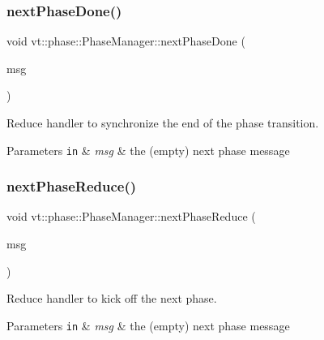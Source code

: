 \subsubsection{\texorpdfstring{next\+Phase\+Done()}{nextPhaseDone()}}
{\footnotesize\ttfamily void vt\+::phase\+::\+Phase\+Manager\+::next\+Phase\+Done (\begin{DoxyParamCaption}\item[{\hyperlink{structvt_1_1phase_1_1_next_msg}{Next\+Msg} $\ast$}]{msg }\end{DoxyParamCaption})\hspace{0.3cm}{\ttfamily [private]}}



Reduce handler to synchronize the end of the phase transition. 


\begin{DoxyParams}[1]{Parameters}
\mbox{\tt in}  & {\em msg} & the (empty) next phase message \\
\hline
\end{DoxyParams}
\mbox{\label{structvt_1_1phase_1_1_phase_manager_a59345a6496fb1413de1a1899fe4532cf}} 
\subsubsection{\texorpdfstring{next\+Phase\+Reduce()}{nextPhaseReduce()}}
{\footnotesize\ttfamily void vt\+::phase\+::\+Phase\+Manager\+::next\+Phase\+Reduce (\begin{DoxyParamCaption}\item[{\hyperlink{structvt_1_1phase_1_1_next_msg}{Next\+Msg} $\ast$}]{msg }\end{DoxyParamCaption})\hspace{0.3cm}{\ttfamily [private]}}



Reduce handler to kick off the next phase. 


\begin{DoxyParams}[1]{Parameters}
\mbox{\tt in}  & {\em msg} & the (empty) next phase message \\
\hline
\end{DoxyParams}
\mbox{\label{structvt_1_1phase_1_1_phase_manager_a789e81d0a1ae09f1aeac4e72fd884584}} 

